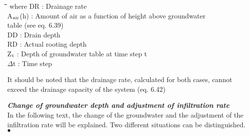 \documentclass[11pt]{article}
\begin{document}
\bigskip
\bigskip
\nwln
\begin{tabbing}
\hspace{1.27cm}\=\hspace{1.27cm}\=\hspace{1.27cm}\=\hspace{1.27cm}\=%
\hspace{1.27cm}\=\hspace{1.27cm}\=\hspace{1.27cm}\=\hspace{1.27cm}\=%
\hspace{1.27cm}\=\hspace{1.27cm}\=\kill
where\> DR\> : Drainage rate\> \> \> \> \> \> \> \> [cm d$^{{\rm -1}}$]\\
\>A$_{{\rm air}}$(h)\> : Amount of air as a function of height above groundwater \\
\>\>   table\>  (see eq. 6.39)\> \> \> \> \> \> \> [cm]\\
\>DD\> : Drain depth\> \> \> \> \> \> \> \> [cm]\\
\>RD\> : Actual rooting depth\> \> \> \> \> \> \> \> [cm]\\
\>Z$_{{\rm t}}$\> : Depth of groundwater table at time step t\> \> \> \> \> \> \> \> [cm]\\
\>$\Delta$t\> : Time step\> \> \> \> \> \> \> \> [d]
\end{tabbing}

\bigskip
It should be noted that the drainage rate, calculated for both cases, cannot exceed the
drainage capacity of the system (eq. 6.42)

\bigskip
\bigskip
{\bf {\it Change of groundwater depth and adjustment of infiltration rate\/}}\\
In the following text, the change of the groundwater and the adjustment of the infiltration
rate will be explained. Two different situations can be distinguished.\\
$\bullet$
\testlastline
\end{document}
